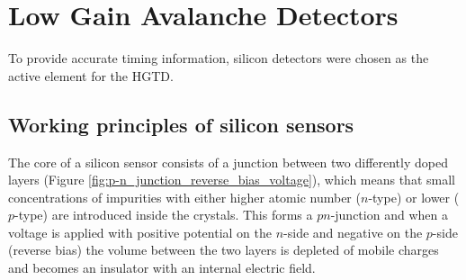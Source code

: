 



\section{Low Gain Avalanche Detectors}


To provide accurate timing information, silicon detectors were chosen as the active element for the HGTD.

\subsection{Working principles of silicon sensors}

The core of a silicon sensor consists of a junction between two differently doped layers (Figure \ref{fig:p-n_junction_reverse_bias_voltage}), which means that small concentrations of impurities with either higher atomic number ($n$-type) or lower ($p$-type) are introduced inside the crystals.
This forms a $pn$-junction and when a voltage is applied with positive potential on the $n$-side and negative on the $p$-side (reverse bias) the volume between the two layers is depleted of mobile charges and becomes an insulator with an internal electric field.

